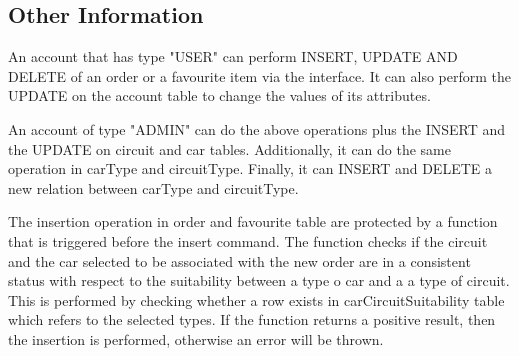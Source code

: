 \subsection{Other Information}

An account that has type "USER" can perform INSERT, UPDATE AND DELETE of an order or a favourite item via the interface. It can also perform the UPDATE on the account table to change the values of its attributes.

An account of type "ADMIN" can do the above operations plus the INSERT and the UPDATE on circuit and car tables. Additionally, it can do the same operation in carType and circuitType. Finally, it can INSERT and DELETE a new relation between carType and circuitType.

The insertion operation in order and favourite table are protected by a function that is triggered before the insert command. The function checks if the circuit and the car selected to be associated with the new order are in a consistent status with respect to the suitability between a type o car and a a type of circuit. This is performed by checking whether a row exists in carCircuitSuitability table which refers to the selected types. If the function returns a positive result, then the insertion is performed, otherwise an error will be thrown.